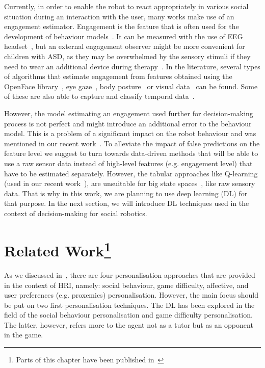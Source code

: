 \documentclass[thesis]{mas_proposal}
\begin{document}
Currently, in order to enable the robot to react appropriately in various social situation during an interaction with the user, many works make use of an engagement estimator. Engagement is the feature that is often used for the development of behaviour models~\cite{senft2015sparc,senft2015human,tsiakas2018task,del2022learning}. It can be measured with the use of EEG headset~\cite{tsiakas2018task}, but an external engagement observer might be more convenient for children with ASD, as they may be overwhelmed by the sensory stimuli if they need to wear an additional device during therapy~\cite{javed2019robotic}. In the literature, several types of algorithms that estimate engagement from features obtained using the OpenFace library~\cite{baltrusaitis2018openface, jain2020modeling, kaur2019domain, karimah2021implementation}, eye gaze~\cite{khorrami2014system},  body posture~\cite{ritschel2017adapting} or visual data~\cite{mane2018engagement, del2020you} can be found. Some of these are also able to capture and classify temporal data~\cite{del2020you, karimah2021implementation}.

However, the model estimating an engagement used further for decision-making process is not perfect and might introduce an additional error to the behaviour model. This is a problem of a significant impact on the robot behaviour and was mentioned in our recent work~\cite{stolarz2022learningbased}. To alleviate the impact of false predictions on the feature level we suggest to turn towards data-driven methods that will be able to use a raw sensor data instead of high-level features (e.g. engagement level) that have to be estimated separately. However, the tabular approaches like Q-learning (used in our recent work~\cite{stolarz2022learningbased}), are unsuitable for big state spaces~\cite{akalin2021reinforcement}, like raw sensory data. That is why in this work, we are planning to use deep learning (DL) for that purpose. In the next section, we will introduce DL techniques used in the context of decision-making for social robotics.


\section[Related Work]{Related Work\footnote{Parts of this chapter have been published in~\cite{stolarz2022personalized}}}

As we discussed in~\cite{stolarz2022personalized}, there are four personalisation approaches that are provided in the context of HRI, namely: social behaviour, game difficulty, affective, and user preferences (e.g. proxemics) personalisation. However, the main focus should be put on two first personalisation techniques. The DL has been explored in the field of the social behaviour personalisation and game difficulty personalisation. The latter, however, refers more to the agent not as a tutor but as an opponent in the game.
\end{document}
